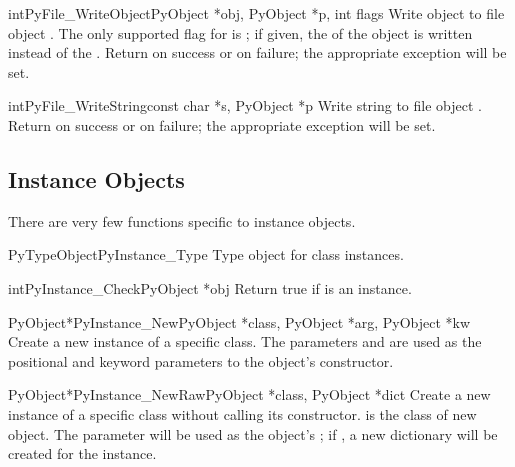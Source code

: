 \begin{cfuncdesc}{int}{PyFile_WriteObject}{PyObject *obj, PyObject *p,
                                           int flags}
  Write object  to file object .  The only supported
  flag for  is
  ; if given, the
   of the object is written instead of the
  .  Return  on success or  on
  failure; the appropriate exception will be set.
\end{cfuncdesc}

\begin{cfuncdesc}{int}{PyFile_WriteString}{const char *s, PyObject *p}
  Write string  to file object .  Return  on
  success or  on failure; the appropriate exception will be
  set.
\end{cfuncdesc}


\subsection{Instance Objects \label{instanceObjects}}

There are very few functions specific to instance objects.

\begin{cvardesc}{PyTypeObject}{PyInstance_Type}
  Type object for class instances.
\end{cvardesc}

\begin{cfuncdesc}{int}{PyInstance_Check}{PyObject *obj}
  Return true if  is an instance.
\end{cfuncdesc}

\begin{cfuncdesc}{PyObject*}{PyInstance_New}{PyObject *class,
                                             PyObject *arg,
                                             PyObject *kw}
  Create a new instance of a specific class.  The parameters 
  and  are used as the positional and keyword parameters to
  the object's constructor.
\end{cfuncdesc}

\begin{cfuncdesc}{PyObject*}{PyInstance_NewRaw}{PyObject *class,
                                                PyObject *dict}
  Create a new instance of a specific class without calling its
  constructor.   is the class of new object.  The
   parameter will be used as the object's ;
  if \NULL{}, a new dictionary will be created for the instance.
\end{cfuncdesc}


